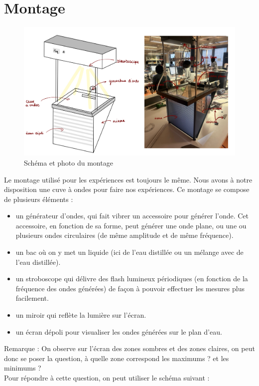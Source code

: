 \documentclass{report}
\begin{document}
\section{Montage}
\begin{figure}[H]
    \centering
    \includegraphics[scale=0.2]{montage.png}
    \caption{Schéma et photo du montage}
    \label{}
\end{figure}
Le montage utilisé pour les expériences est toujours le même. Nous avons à notre disposition une cuve à ondes pour faire nos expériences. Ce montage se compose de plusieurs éléments :
\begin{itemize}[label=]
    \item un générateur d'ondes, qui fait vibrer un accessoire pour générer l'onde. Cet accessoire, en fonction de sa forme, peut générer une onde plane, ou une ou plusieurs ondes circulaires (de même amplitude et de même fréquence).
    \item un bac où on y met un liquide (ici de l'eau distillée ou un mélange avec de l'eau distillée).
    \item un stroboscope qui délivre des flash lumineux périodiques (en fonction de la fréquence des ondes générées) de façon à pouvoir effectuer les mesures plus facilement.
    \item un miroir qui reflète la lumière sur l'écran.
    \item un écran dépoli pour visualiser les ondes générées sur le plan d'eau.
\end{itemize}

Remarque : On observe sur l'écran des zones sombres et des zones claires, on peut donc se poser la question, à quelle zone correspond les maximums ? et les minimums ?\\
Pour répondre à cette question, on peut utiliser le schéma suivant : 
\end{document}
